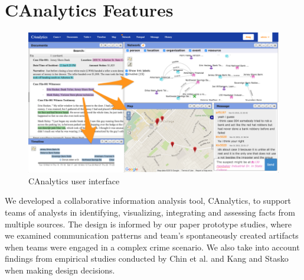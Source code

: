 \documentclass[]{article}
\date{}
\begin{document}
\section{CAnalytics Features}\label{canalytics-features}

\begin{figure}
\centering
\includegraphics{./img/interface.png}
\caption{CAnalytics user interface}
\end{figure}

We developed a collaborative information analysis tool, CAnalytics, to
support teams of analysts in identifying, visualizing, integrating and
assessing facts from multiple sources. The design is informed by our
paper prototype studies, where we examined communication patterns and
team's spontaneously created artifacts when teams were engaged in a
complex crime scenario. We also take into account findings from
empirical studies conducted by Chin et al. \autocite{Chin2009} and Kang
and Stasko \autocite{Kang2011} when making design decisions.
\end{document}
